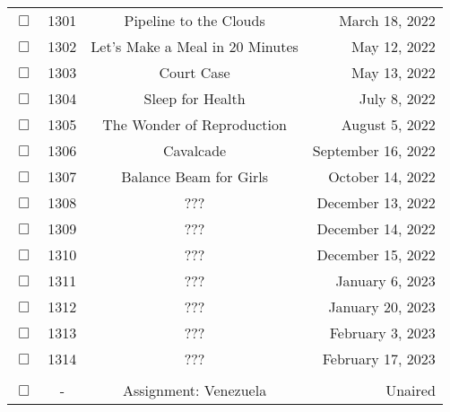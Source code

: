 \documentclass[12pt]{article}
\begin{document}
\begin{center}
\begin{longtable}[c]{cccr}
$\Box$&1301&Pipeline to the Clouds&March 18, 2022\\
$\Box$&1302&Let's Make a Meal in 20 Minutes&May 12, 2022\\
$\Box$&1303&Court Case&May 13, 2022\\
$\Box$&1304&Sleep for Health&July 8, 2022\\
$\Box$&1305&The Wonder of Reproduction&August 5, 2022\\
$\Box$&1306&Cavalcade&September 16, 2022\\
$\Box$&1307&Balance Beam for Girls&October 14, 2022\\
$\Box$&1308&???&December 13, 2022\\
$\Box$&1309&???&December 14, 2022\\
$\Box$&1310&???&December 15, 2022\\
$\Box$&1311&???&January 6, 2023\\
$\Box$&1312&???&January 20, 2023\\
$\Box$&1313&???&February 3, 2023\\
$\Box$&1314&???&February 17, 2023\\

\\  %
$\Box$&-&Assignment: Venezuela&Unaired\\
\end{longtable}\end{center}
\end{document}
